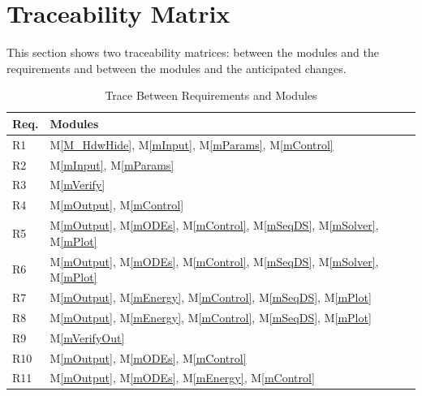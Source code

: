 \documentclass[12pt, titlepage]{article}
\newcommand{\mref}[1]{M\ref{#1}}
\begin{document}
\section{Traceability Matrix} \label{SecTM}

This section shows two traceability matrices: between the modules and the
requirements and between the modules and the anticipated changes.

\begin{table}[H]
\centering
\begin{tabular}{p{} p{}}
\toprule
\textbf{Req.} & \textbf{Modules}\\
\midrule
R1 & \mref{M_HdwHide}, \mref{mInput}, \mref{mParams}, \mref{mControl}\\
R2 & \mref{mInput}, \mref{mParams}\\
R3 & \mref{mVerify}\\
R4 & \mref{mOutput}, \mref{mControl}\\
R5 & \mref{mOutput}, \mref{mODEs}, \mref{mControl}, \mref{mSeqDS}, \mref{mSolver}, \mref{mPlot}\\
R6 & \mref{mOutput}, \mref{mODEs}, \mref{mControl}, \mref{mSeqDS}, \mref{mSolver}, \mref{mPlot}\\
R7 & \mref{mOutput}, \mref{mEnergy}, \mref{mControl}, \mref{mSeqDS}, \mref{mPlot}\\
R8 & \mref{mOutput}, \mref{mEnergy}, \mref{mControl}, \mref{mSeqDS}, \mref{mPlot}\\
R9 & \mref{mVerifyOut}\\
R10 & \mref{mOutput}, \mref{mODEs}, \mref{mControl}\\
R11 & \mref{mOutput}, \mref{mODEs}, \mref{mEnergy}, \mref{mControl}\\
\bottomrule
\end{tabular}
\caption{Trace Between Requirements and Modules}
\label{TblRT}
\end{table}
\end{document}
